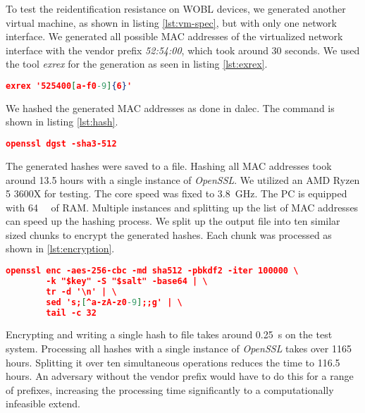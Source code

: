     To test the reidentification resistance on WOBL devices, we generated another virtual machine, as shown in listing \ref{lst:vm-spec}, but with only one network interface. 
    We generated all possible MAC addresses of the virtualized network interface with the vendor prefix \textit{52:54:00}, which took around 30 seconds. We used the tool \textit{exrex} \cite{tauber_asciimooexrex_2021} for the generation as seen in listing \ref{lst:exrex}. 
    
    \begin{lstlisting}[language=json, caption=MAC generation with exrex, label=lst:exrex]
    exrex '525400[a-f0-9]{6}'
    \end{lstlisting}    
    
    We hashed the generated MAC addresses as done in dalec. The command is shown in listing \ref{lst:hash}.
    
    \begin{lstlisting}[language=json, caption=MAC hashing with OpenSSL, label=lst:hash]
openssl dgst -sha3-512
    \end{lstlisting}
    
    The generated hashes were saved to a file. Hashing all MAC addresses took around 13.5 hours with a single instance of \textit{OpenSSL}.
    We utilized an AMD Ryzen 5 3600X for testing. The core speed was fixed to \SIlist{3.8}{\giga\hertz}. The PC is equipped with \SIlist{64}{\giga\byte} of RAM.
    Multiple instances and splitting up the list of MAC addresses can speed up the hashing process.
    We split up the output file into ten similar sized chunks to encrypt the generated hashes. Each chunk was processed as shown in \ref{lst:encryption}.
    
    \begin{lstlisting}[language=json, caption=ID encryption and truncation, label=lst:encryption]
    openssl enc -aes-256-cbc -md sha512 -pbkdf2 -iter 100000 \                          
        -k "$key" -S "$salt" -base64 | \                                      
        tr -d '\n' | \                                                        
        sed 's;[^a-zA-z0-9];;g' | \
        tail -c 32
    \end{lstlisting}
    
    Encrypting and writing a single hash to file takes around \SIlist{0.25}{\second} on the test system. Processing all hashes with a single instance of \textit{OpenSSL} takes over 1165 hours. Splitting it over ten simultaneous operations reduces the time to 116.5 hours.
    An adversary without the vendor prefix would have to do this for a range of prefixes, increasing the processing time significantly to a computationally infeasible extend.
    
